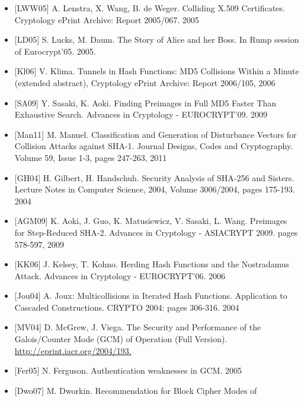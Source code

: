 \documentclass[a4paper]{article}
\begin{document}
\begin{multicols}{3}
\begin{itemize}
        \item
              {[}LWW05{]} A. Lenstra, X. Wang, B. de Weger. Colliding X.509
              Certificates. Cryptology ePrint Archive: Report 2005/067. 2005
        \item
              {[}LD05{]} S. Lucks, M. Daum. The Story of Alice and her Boss. In Rump
              session of Eurocrypt'05. 2005.
        \item
              {[}Kl06{]} V. Klima. Tunnels in Hash Functions: MD5 Collisions Within
              a Minute (extended abstract), Cryptology ePrint Archive: Report
              2006/105, 2006
        \item
              {[}SA09{]} Y. Sasaki, K. Aoki. Finding Preimages in Full MD5 Faster
              Than Exhaustive Search. Advances in Cryptology - EUROCRYPT'09. 2009
        \item
              {[}Man11{]} M. Manuel. Classification and Generation of Disturbance
              Vectors for Collision Attacks against SHA-1. Journal Designs, Codes
              and Cryptography. Volume 59, Issue 1-3, pages 247-263, 2011
        \item
              {[}GH04{]} H. Gilbert, H. Handschuh. Security Analysis of SHA-256 and
              Sisters. Lecture Notes in Computer Science, 2004, Volume 3006/2004,
              pages 175-193. 2004
        \item
              {[}AGM09{]} K. Aoki, J. Guo, K. Matusiewicz, V. Sasaki, L. Wang.
              Preimages for Step-Reduced SHA-2. Advances in Cryptology - ASIACRYPT
              2009. pages 578-597, 2009
        \item
              {[}KK06{]} J. Kelsey, T. Kohno. Herding Hash Functions and the
              Nostradamus Attack. Advances in Cryptology - EUROCRYPT'06. 2006
        \item
              {[}Jou04{]} A. Joux: Multicollisions in Iterated Hash Functions.
              Application to Cascaded Constructions. CRYPTO 2004: pages 306-316.
              2004
        \item
              {[}MV04{]} D. McGrew, J. Viega. The Security and Performance of the
              Galois/Counter Mode (GCM) of Operation (Full Version).
              \href{http://eprint.iacr.org/2004/193.}{http://eprint.iacr.org/2004/193.}
        \item
              {[}Fer05{]} N. Ferguson. Authentication weaknesses in GCM. 2005
        \item
              {[}Dwo07{]} M. Dworkin. Recommendation for Block Cipher Modes of

\end{itemize}
\end{multicols}
\end{document}
